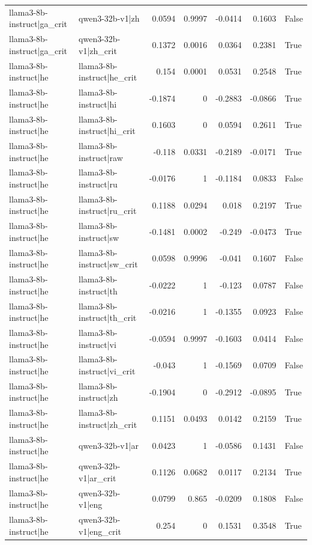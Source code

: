 \begin{table}
\begin{tabular}{l l r r r r l}
llama3-8b-instruct|ga_crit & qwen3-32b-v1|zh & 0.0594 & 0.9997 & -0.0414 & 0.1603 & False \\
llama3-8b-instruct|ga_crit & qwen3-32b-v1|zh_crit & 0.1372 & 0.0016 & 0.0364 & 0.2381 & True \\
llama3-8b-instruct|he & llama3-8b-instruct|he_crit & 0.154 & 0.0001 & 0.0531 & 0.2548 & True \\
llama3-8b-instruct|he & llama3-8b-instruct|hi & -0.1874 & 0 & -0.2883 & -0.0866 & True \\
llama3-8b-instruct|he & llama3-8b-instruct|hi_crit & 0.1603 & 0 & 0.0594 & 0.2611 & True \\
llama3-8b-instruct|he & llama3-8b-instruct|raw & -0.118 & 0.0331 & -0.2189 & -0.0171 & True \\
llama3-8b-instruct|he & llama3-8b-instruct|ru & -0.0176 & 1 & -0.1184 & 0.0833 & False \\
llama3-8b-instruct|he & llama3-8b-instruct|ru_crit & 0.1188 & 0.0294 & 0.018 & 0.2197 & True \\
llama3-8b-instruct|he & llama3-8b-instruct|sw & -0.1481 & 0.0002 & -0.249 & -0.0473 & True \\
llama3-8b-instruct|he & llama3-8b-instruct|sw_crit & 0.0598 & 0.9996 & -0.041 & 0.1607 & False \\
llama3-8b-instruct|he & llama3-8b-instruct|th & -0.0222 & 1 & -0.123 & 0.0787 & False \\
llama3-8b-instruct|he & llama3-8b-instruct|th_crit & -0.0216 & 1 & -0.1355 & 0.0923 & False \\
llama3-8b-instruct|he & llama3-8b-instruct|vi & -0.0594 & 0.9997 & -0.1603 & 0.0414 & False \\
llama3-8b-instruct|he & llama3-8b-instruct|vi_crit & -0.043 & 1 & -0.1569 & 0.0709 & False \\
llama3-8b-instruct|he & llama3-8b-instruct|zh & -0.1904 & 0 & -0.2912 & -0.0895 & True \\
llama3-8b-instruct|he & llama3-8b-instruct|zh_crit & 0.1151 & 0.0493 & 0.0142 & 0.2159 & True \\
llama3-8b-instruct|he & qwen3-32b-v1|ar & 0.0423 & 1 & -0.0586 & 0.1431 & False \\
llama3-8b-instruct|he & qwen3-32b-v1|ar_crit & 0.1126 & 0.0682 & 0.0117 & 0.2134 & True \\
llama3-8b-instruct|he & qwen3-32b-v1|eng & 0.0799 & 0.865 & -0.0209 & 0.1808 & False \\
llama3-8b-instruct|he & qwen3-32b-v1|eng_crit & 0.254 & 0 & 0.1531 & 0.3548 & True \\

\end{tabular}
\end{table}
